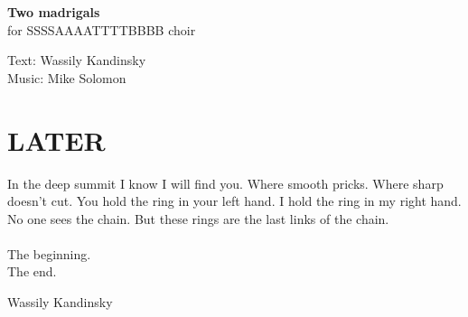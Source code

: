 \documentclass[a4paper]{book}
\begin{document}
\begin{titlepage}
\begin{flushright}
{\Huge \bfseries Two madrigals \\ }
{\large for SSSSAAAATTTTBBBB choir}
\par
{}
{\large Text: Wassily Kandinsky \\}
{\large Music: Mike Solomon \\}
\end{flushright}
\end{titlepage}
\thispagestyle{empty} 
\frontmatter
\clearpage
{}
\section*{LATER}
In the deep summit I know I will find you. Where smooth pricks. Where sharp doesn't cut. You hold the 
ring in your left hand. I hold the ring in my right hand. No one sees the chain. But these rings are the 
last links of the chain.\\\hfill\\
The beginning.\\
The end.\\
\begin{flushright}
Wassily Kandinsky
\end{flushright}
\clearpage
{}
\end{document}

